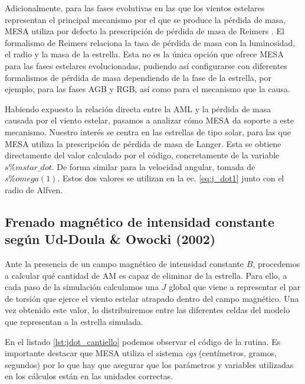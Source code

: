 Adicionalmente, para las fases evolutivas en las que los vientos estelares representan el principal mecanismo por el que se produce la pérdida de masa, MESA utiliza por defecto la prescripción de pérdida de masa de Reimers \citep{Reimers1975}. El formalismo de Reimers relaciona la tasa de pérdida de masa con la luminosidad, el radio y la masa de la estrella. Esta no es la única opción que ofrece MESA para las fases estelares evolucionadas, pudiendo así configurarse con diferentes formalismos de pérdida de masa dependiendo de la fase de la estrella, por ejemplo, para las fases AGB y RGB,  así como para el mecanismo que la causa. \par

Habiendo expuesto la relación directa entre la AML y la pérdida de masa causada por el viento estelar, pasamos a analizar cómo MESA da soporte a este mecanismo. Nuestro interés se centra en las estrellas de tipo solar, para las que MESA utiliza la prescripción de pérdida de masa de Langer. Esta se obtiene directamente del valor calculado por el código, concretamente de la variable $s\% mstar\_dot$. De forma similar para la velocidad angular, tomada de $s\% omega(1)$. Estos dos valores se utilizan en la ec. \ref{eq:j_dot1} junto con el radio de Alfven.

\subsection{Frenado magnético de intensidad constante según Ud-Doula \& Owocki (2002)} \label{sec:mb_cte_b}
Ante la presencia de un campo magnético de intensidad constante $B$, procedemos a calcular qué cantidad de AM es capaz de eliminar de la estrella. Para ello, a cada paso de la simulación calculamos una $\Dot{J}$ global que viene a representar el par de torsión que ejerce el viento estelar atrapado dentro del campo magnético. Una vez obtenido este valor, lo distribuiremos entre las diferentes celdas del modelo que representan a la estrella simulada.\par

En el listado \ref{lst:jdot_cantiello} podemos observar el código de la rutina. Es importante destacar que MESA utiliza el sistema \textit{cgs} (centímetros, gramos, segundos) por lo que hay que asegurar que los parámetros y variables utilizadas en los cálculos están en las unidades correctas.\par

